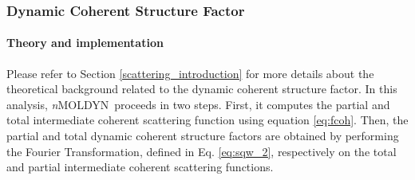 \documentclass[a4paper,11pt]{report}
\newcommand{\NMOLDYN}{\textit{n}MOLDYN}
\begin{document}
\subsubsection{Dynamic Coherent Structure Factor}
\label{dcsf}
\paragraph{Theory and implementation\\}
\label{dcsf_theory}
Please refer to Section \ref{scattering_introduction} for more details about the theoretical background related to the dynamic 
coherent structure factor. In this analysis, \NMOLDYN\ proceeds in two steps. First, it computes the partial and total 
intermediate coherent scattering function using equation \ref{eq:fcoh}. Then, the partial and total dynamic coherent 
structure factors are obtained by performing the Fourier Transformation, defined in Eq. \ref{eq:sqw_2}, respectively on 
the total and partial intermediate coherent scattering functions.
\end{document}
